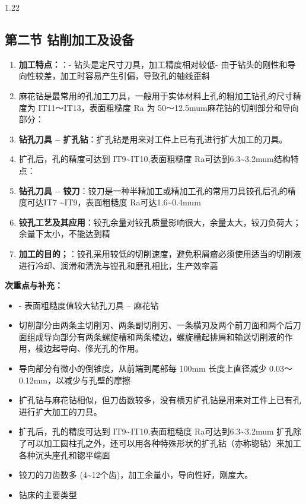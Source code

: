 \documentclass[12pt,a4paper]{article}
\begin{document}
\begin{spacing}{1.22}
\subsection{第二节 钻削加工及设备}
\begin{tcolorbox}[colback=yellow!6,colframe=red!55!black,title=重点,left=1mm,right=1mm]
\begin{enumerate}[leftmargin=2.2em,label=\arabic*.]
  \item \textbf{加工特点：}：- 钻头是定尺寸刀具，加工精度相对较低- 由于钻头的刚性和导向性较差，加工时容易产生引偏，导致孔的轴线歪斜
  \item 麻花钻是最常用的孔加工刀具，一般用于实体材料上孔的粗加工钻孔的尺寸精度为 IT11～IT13，表面粗糙度 Ra 为 50～12.5mum麻花钻的切削部分和导向部分：
  \item \textbf{钻孔刀具 – 扩孔钻}：扩孔钻是用来对工件上已有孔进行扩大加工的刀具。
  \item 扩孔后，孔的精度可达到 IT9\textasciitilde{}IT10,表面粗糙度 Ra可达到6.3\textasciitilde{}3.2mum结构特点：
  \item \textbf{钻孔刀具 – 铰刀}：铰刀是一种半精加工或精加工孔的常用刀具铰孔后孔的精度可达IT7 \textasciitilde{}IT9，表面粗糙度 Ra可达1.6\textasciitilde{}0.4mum
  \item \textbf{铰孔工艺及其应用}：铰孔余量对铰孔质量影响很大，余量太大，铰刀负荷大；余量下太小，不能达到精
  \item \textbf{加工的目的；}：铰孔采用较低的切削速度，避免积屑瘤必须使用适当的切削液进行冷却、润滑和清洗与镗孔和磨孔相比，生产效率高
\end{enumerate}
\end{tcolorbox}
\noindent\textbf{次重点与补充：}
\begin{itemize}[leftmargin=2.2em,label=--]
  \item - 表面粗糙度值较大钻孔刀具 – 麻花钻
  \item 切削部分由两条主切削刃、两条副切削刃、一条横刃及两个前刀面和两个后刀面组成导向部分有两条螺旋槽和两条棱边，螺旋槽起排屑和输送切削液的作用，棱边起导向、修光孔的作用。
  \item 导向部分有微小的倒锥度，从前端到尾部每 100mm 长度上直径减少 0.03～0.12mm，以减少与孔壁的摩擦
  \item 扩孔钻与麻花钻相似，但刀齿数较多，没有横刃扩孔钻是用来对工件上已有孔进行扩大加工的刀具。
  \item 扩孔后，孔的精度可达到 IT9\textasciitilde{}IT10,表面粗糙度 Ra可达到6.3\textasciitilde{}3.2mum 扩孔除了可以加工圆柱孔之外，还可以用各种特殊形状的扩孔钻（亦称锪钻）来加工各种沉头座孔和锪平端面
  \item 铰刀的刀齿数多 (4\textasciitilde{}12个齿)，加工余量小，导向性好，刚度大。
  \item 钻床的主要类型
\end{itemize}


\end{spacing}
\end{document}

